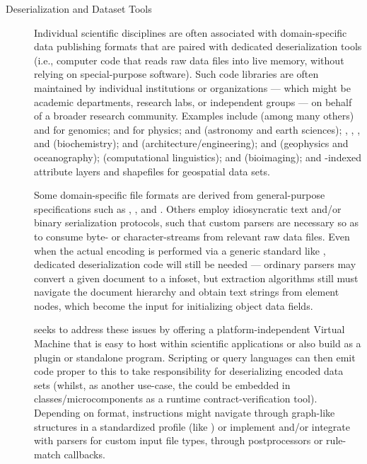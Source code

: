 \documentclass[11pt]{article}
\begin{document}
{{\begin{description}
\item[Deserialization and Dataset Tools]  Individual scientific disciplines are often 
associated with domain-specific data publishing formats that are paired with 
dedicated deserialization tools (i.e., computer code that 
reads raw data files into live memory, without relying on special-purpose 
software).  Such code libraries are often maintained by individual 
institutions or organizations --- which might be academic departments, research 
labs, or independent groups --- on behalf of a 
broader research community.  Examples include (among many others) 
\FASTQ{} and \VCF{} for genomics; \HDFfive{} and \ROOT{} for physics; 
\FITS{} and \netCDF{} (astronomy and earth sciences); \PDB{}, \MOL{}, 
\SBML{}, and \CELLML{} (biochemistry); 
\IFC{} and \BIM{} (architecture/engineering); \SEGY{} and \BAG{} 
(geophysics and oceanography); \CoNLLU{} (computational linguistics); 
\DICOM{} and \OMETIFF{} (bioimaging); and \GIS{}-indexed attribute layers 
and shapefiles for geospatial data sets.

\pseudoIndent{} Some domain-specific file formats are derived from general-purpose 
specifications such as \XML{}, \CSV{}, and \JSON{}.  Others 
employ idiosyncratic text and/or binary 
serialization protocols, such that custom parsers are necessary so as to consume 
byte- or character-streams from 
relevant raw data files.  Even when the actual encoding is performed via a 
generic standard like \XML{}, dedicated deserialization code will still be needed --- 
ordinary parsers may convert a given \XML{} document to a %
\DOM{} infoset, but extraction algorithms 
still must navigate the document hierarchy and obtain 
text strings from element nodes, which become the input for initializing 
object data fields.

\pseudoIndent{} \lPacTk{} seeks to address these issues by offering a 
platform-independent Virtual Machine that is easy to host within 
scientific applications or also build as a plugin or standalone program.  
Scripting 
or query languages can then emit code proper to this \VM{} to 
take responsibility for deserializing encoded data sets 
(whilst, as another use-case, the \VM{} could be embedded in 
\Cpp{} classes/microcomponents   
as a runtime contract-verification tool).  Depending 
on format, \VM{} instructions might navigate through 
graph-like structures in a standardized profile (like \XML{}) 
or implement and/or integrate with parsers for custom input file types, 
through postprocessors or rule-match callbacks.  


\end{description}}}
\end{document}

